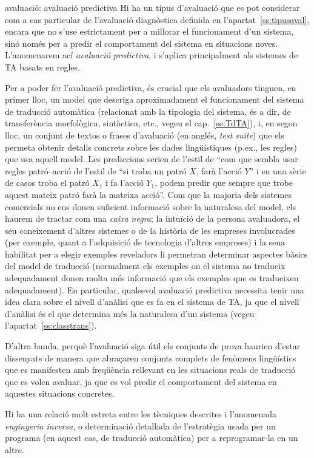 \begin{persabermes}{avaluació: avaluació predictiva}
  Hi ha un tipus d'avaluació que es pot considerar com a cas
  particular de l'avaluació diagnòstica definida en
  l'apartat~\ref{ss:tipusaval}, encara que no s'use estrictament per a
  millorar el funcionament d'un sistema, sinó només per a predir el
  comportament del sistema en situacions noves.  L'anomenarem ací
  \emph{avaluació predictiva}, i s'aplica principalment als sistemes
  de TA basats en regles.

  Per a poder fer l'avaluació predictiva, és crucial que els
  avaluadors tinguen, en primer lloc, un model que descriga
  aproximadament el funcionament del sistema de traducció automàtica
  (relacionat amb la tipologia del sistema, és a dir, de transferència
  morfològica, sintàctica, etc., vegeu el cap.~\ref{se:TdTA}), i, en
  segon lloc, un conjunt de textos o frases d'avaluació (en anglés,
  \emph{test suite}) que els permeta obtenir detalls concrets sobre
  les dades lingüístiques (p.ex., les regles) que usa aquell model.
  Les prediccions serien de l'estil de ``com que sembla usar regles
  patró--acció de l'estil de ``si troba un patró $X$, farà l'acció
  $Y$'' i en una sèrie de casos troba el patró $X_1$ i fa l'acció
  $Y_1$, podem predir que sempre que trobe aquest mateix patró farà la
  mateixa acció''. Com que la majoria dels sistemes comercials no ens
  donen suficient informació sobre la naturalesa del model, els haurem
  de tractar com una \emph{caixa negra}; la intuïció de la persona
  avaluadora, el seu coneixement d'altres sistemes o de la història de
  les empreses involucrades (per exemple, quant a l'adquisició de
  tecnologia d'altres empreses) i la seua habilitat per a elegir
  exemples reveladors li permetran determinar aspectes bàsics del
  model de traducció (normalment els exemples on el sistema no
  tradueix adequadament donen molta més informació que els exemples
  que es tradueixen adequadament). En particular, qualsevol avaluació
  predictiva necessita tenir una idea clara sobre el nivell d'anàlisi
  que es fa en el sistema de TA, ja que el nivell d'anàlisi és el que
  determina més la naturalesa d'un sistema (vegeu
  l'apartat~\ref{ss:classtrans}).

  D'altra banda, perquè l'avaluació siga útil els conjunts de prova
  haurien d'estar dissenyats de manera que abraçaren conjunts complets
  de fenòmens lingüístics que es manifesten amb freqüència rellevant
  en les situacions reals de traducció que es volen avaluar, ja que es
  vol predir el comportament del sistema en aquestes situacions
  concretes.

  Hi ha una relació molt estreta entre les tècniques descrites i
  l'anomenada \emph{enginyeria inversa}, o determinació detallada de
  l'estratègia usada per un programa (en aquest cas, de traducció
  automàtica) per a reprogramar-la en un altre.
\end{persabermes}

